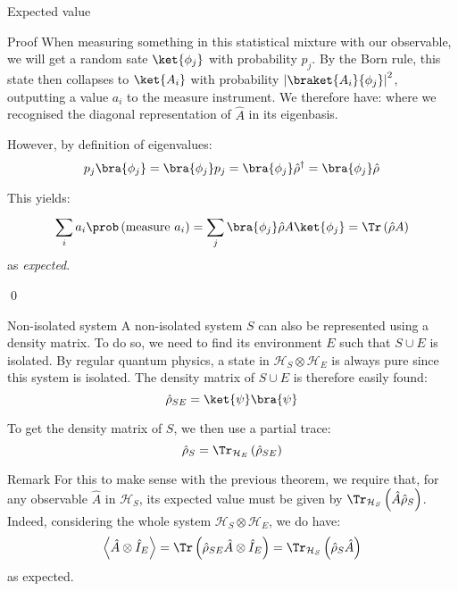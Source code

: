 \documentclass[a4paper]{article}
\begin{document}
\begin{parag}{Expected value}
\begin{subparag}{Proof}
        When measuring something in this statistical mixture with our observable, we will get a random sate $\ket{\phi_j}$ with probability $p_j$. By the Born rule, this state then collapses to $\ket{A_i}$ with probability $\left|\braket{A_i}{\phi_j}\right|^2$, outputting a value $a_i$ to the measure instrument. We therefore have: 
        where we recognised the diagonal representation of $\hat{A}$ in its eigenbasis.

        However, by definition of eigenvalues: 
        \[p_j \bra{\phi_j} = \bra{\phi_j} p_j = \bra{\phi_j} \hat{\rho}^{\dagger} = \bra{\phi_j} \hat{\rho}\]
        
        This yields: 
        \[\sum_{i}^{} a_i \prob\left(\text{measure $a_i$}\right) = \sum_{j}^{} \bra{\phi_j} \hat{\rho} A \ket{\phi_j} = \Tr\left(\hat{\rho} A\right)\]
        as \textit{expected}.

        \qed
    \end{subparag}
\end{parag}

\begin{parag}{Non-isolated system}
    A non-isolated system $S$ can also be represented using a density matrix. To do so, we need to find its environment $E$ such that $S \cup E$ is isolated. By regular quantum physics, a state in $\mathcal{H}_S \otimes \mathcal{H}_E$ is always pure since this system is isolated. The density matrix of $S \cup E$ is therefore easily found:  
    \[\hat{\rho}_{SE} = \ket{\psi} \bra{\psi}\]
    
    To get the density matrix of $S$, we then use a partial trace: 
    \[\hat{\rho}_S = \Tr_{\mathcal{H}_E} \left(\hat{\rho}_{SE}\right)\]

    \begin{subparag}{Remark}
        For this to make sense with the previous theorem, we require that, for any observable $\hat{A}$ in $\mathcal{H}_S$, its expected value must be given by $\Tr_{\mathcal{H}_S}\left(\hat{A} \hat{\rho}_S\right)$. Indeed, considering the whole system $\mathcal{H}_S \otimes \mathcal{H}_E$, we do have:
        \[\left\langle \hat{A} \otimes \hat{I}_E \right\rangle = \Tr\left(\hat{\rho}_{SE} \hat{A} \otimes \hat{I}_E\right) = \Tr_{\mathcal{H}_S}\left(\hat{\rho}_S \hat{A}\right)\]
        as expected.
    \end{subparag}
\end{parag}
\end{document}
